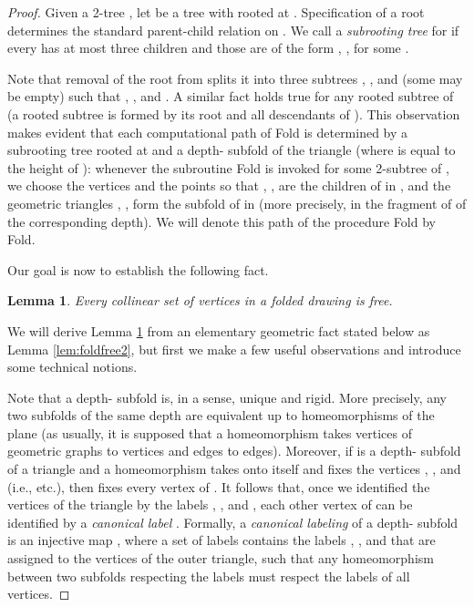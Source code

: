 \documentclass[reqno,12pt]{amsart}
\newcommand{\fold}[2]{{\sc Fold}}
\newtheorem{lemma}[theorem]{Lemma}
\begin{document}
\begin{proof}
Given a 2-tree , let  be a tree with  rooted at .
Specification of a root determines the standard parent-child relation on .
We call  a \emph{subrooting tree} for  if every  has at most
three children and those are of the form , ,  for some .

Note that removal of the root  from  splits it into three subtrees
, , and  (some may be empty) such that , 
, and .
A similar fact holds true for any rooted subtree of 
(a rooted subtree is formed by its root  and all descendants of ).
This observation makes evident that each computational path of \fold{}{G,abc,ABC}
is determined by a subrooting tree  rooted at  and a depth- subfold 
of the triangle  (where  is equal to the height of ):
whenever the subroutine \fold{}{H,xyz,XYZ} is invoked for some 2-subtree  of ,
we choose the vertices  and the points  so that
, ,  are the children of  in , and
the geometric triangles , ,  form the subfold of  in 
(more precisely, in the fragment of  of the corresponding depth).
We will denote this path of the procedure \fold{}{G,abc,ABC} by \fold{}{R,S}.


Our goal is now to establish the following fact.

\begin{lemma}\label{lem:foldfree}
Every collinear set of vertices in a folded drawing is free.
\end{lemma}

We will derive Lemma \ref{lem:foldfree} from an elementary geometric fact
stated below as Lemma \ref{lem:foldfree2},
but first we make a few useful observations and introduce some technical notions.

Note that a depth- subfold is, in a sense, unique and rigid.
More precisely, any two subfolds of the same depth are equivalent up to homeomorphisms
of the plane
(as usually, it is supposed that a homeomorphism takes vertices of geometric graphs
to vertices and edges to edges). Moreover, if  is a depth- subfold of a triangle 
and a homeomorphism  takes  onto itself and fixes the vertices , , and 
(i.e.,  etc.), then  fixes every vertex of .
It follows that, once we identified the vertices of the triangle by the labels
, , and , each other vertex  of  can be identified by a \emph{canonical label} . 
Formally, a \emph{canonical labeling} of a depth- subfold  is an injective map ,
where a set of labels  contains the labels , , and  that are assigned to the vertices
of the outer triangle, such that any homeomorphism between two subfolds respecting the labels 
must respect the labels of all vertices.




\end{proof}
\end{document}
